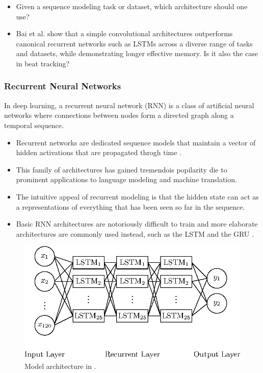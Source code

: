 \documentclass{scrartcl}
\begin{document}
\begin{itemize}
\item Given a sequence modeling task or dataset, which architecture should one use?
\item Bai et al. \cite{Bai2018} show that a simple convolutional architectures outperforms canonical recurrent networks such as LSTMs across a diverse range of tasks and datasets, while demonstrating longer effective memory. Is it also the case in beat tracking?
\end{itemize}


\subsubsection{Recurrent Neural Networks}

In deep learning, a recurrent neural network (RNN) is a class of artificial neural networks where connections between nodes form a directed graph along a temporal sequence.

\begin{itemize}
\item Recurrent networks are dedicated sequence models that maintain a vector of hidden activations that are propagated throgh time \cite{Elman1990,Werbos1990,Graves2012}.
\item This family of architectures has gained tremendois popilarity die to prominent applications to language modeling and machine translation.
\item The intuitive appeal of recurrent modeling is that the hidden state can act as a representations of everything that has been seen so far in the sequence.
\item Basic RNN architectures are notoriously difficult to train and more elaborate architectures are commonly used instead, such as the LSTM \cite{Hochreiter1997} and the GRU \cite{Cho2014}.
\end{itemize}

\begin{figure}[htbp]
\centering
\includegraphics[scale=1.0]{figures/neural_network_boeck.eps}
\caption{Model architecture in \cite{Boeck2011}.}
\label{fig:}
\end{figure}    
\end{document}
